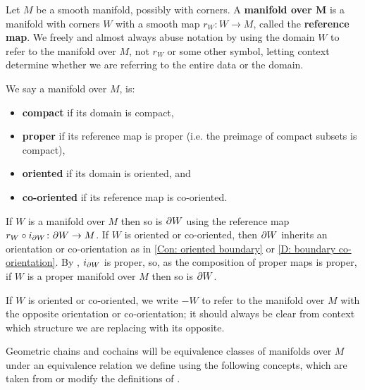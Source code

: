 \begin{definition}\label{V: maps are co-oriented}
	Let $M$ be a smooth manifold, possibly with corners. A \textbf{manifold over $\mathbf{M}$} is a manifold with corners $W$ with a smooth map $r_W \colon W \to M$,
	called the \textbf{reference map}.
	We freely and almost always abuse notation
	by using the domain $W$ to refer to the manifold over $M$, not $r_W$ or some other symbol, letting
	context determine whether we are referring to the entire data or the domain.

	We say a manifold over $M$, is:
	\begin{itemize}
		\item \textbf{compact} if its domain is compact,
		\item \textbf{proper} if its reference map is proper (i.e. the preimage of compact subsets is compact),
		\item \textbf{oriented} if its domain is oriented, and
		\item \textbf{co-oriented} if its reference map is co-oriented.
	\end{itemize}
	If $W$ is a manifold over $M$ then so is $\partial W$ using the reference map $r_W \circ i_{\partial W} \colon \partial W \to M$.
	If $W$ is oriented or co-oriented, then $\partial W$ inherits an orientation or co-orientation as in \cref{Con: oriented boundary} or \cref{D: boundary co-orientation}.
	By \cite[Lemma 2.8]{Joy12}, $i_{\partial W}$ is proper, so, as the composition of proper maps is proper, if $W$ is a proper manifold over $M$ then so is $\partial W$.

	If $W$ is oriented or co-oriented, we write $-W$ to refer to the manifold over $M$ with the opposite orientation or co-orientation; it should always be clear from context which structure we are replacing with its opposite.
\end{definition}


Geometric chains and cochains will be equivalence classes of manifolds over $M$ under an equivalence relation we define using the following concepts, which are taken from or modify
the definitions of \cite{Lipy14}.

